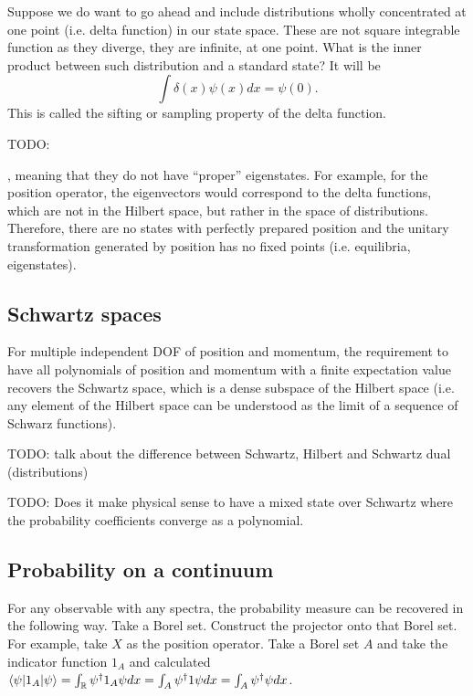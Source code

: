 Suppose we do want to go ahead and include distributions wholly concentrated at one point (i.e. delta function) in our state space. These are not square integrable function as they diverge, they are infinite, at one point. What is the inner product between such distribution and a standard state? It will be
\begin{equation}
	\int \delta(x) \psi(x) dx = \psi(0).
\end{equation}
This is called the sifting or sampling property of the delta function.

TODO:

, meaning that they do not have ``proper'' eigenstates. For example, for the position operator, the eigenvectors would correspond to the delta functions, which are not in the Hilbert space, but rather in the space of distributions. Therefore, there are no states with perfectly prepared position and the unitary transformation generated by position has no fixed points (i.e. equilibria, eigenstates).


\subsection{Schwartz spaces}

For multiple independent DOF of position and momentum, the requirement to have all polynomials of position and momentum with a finite expectation value recovers the Schwartz space, which is a dense subspace of the Hilbert space (i.e. any element of the Hilbert space can be understood as the limit of a sequence of Schwarz functions).

TODO: talk about the difference between Schwartz, Hilbert and Schwartz dual (distributions)

TODO: Does it make physical sense to have a mixed state over Schwartz where the probability coefficients converge as a polynomial.

\subsection{Probability on a continuum}


For any observable with any spectra, the probability measure can be recovered in the following way. Take a Borel set. Construct the projector onto that Borel set. For example, take $X$ as the position operator. Take a Borel set $A$ and take the indicator function $1_A$ and calculated $\langle \psi | 1_A | \psi \rangle = \int_{\mathbb{R}} \psi^\dagger 1_A \psi dx = \int_{A} \psi^\dagger 1 \psi dx = \int_{A} \psi^\dagger \psi dx$.

